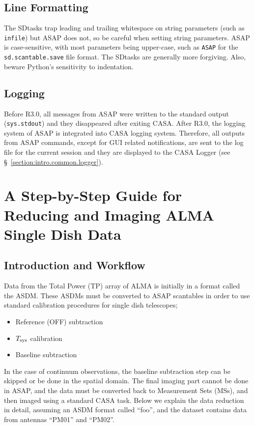 \subsection{Line Formatting}
\label{section:sd.intro.line}

The SDtasks trap leading and trailing whitespace on string parameters
(such as {\tt infile}) but ASAP does not, so be
careful when setting string parameters.  ASAP is case-sensitive,
with most parameters being upper-case, such as {\tt ASAP} for the
{\tt sd.scantable.save} file format.  The SDtasks are generally
more forgiving.  Also, beware Python's sensitivity to indentation.

\subsection{Logging}
\label{section:sd.intro.log}

Before R3.0, all messages from ASAP were written to the standard output
({\tt sys.stdout}) and they disappeared after exiting CASA. After R3.0, the
logging system of ASAP is integrated into CASA logging system.  Therefore, 
all outputs from ASAP commands, except for GUI related notifications, 
are sent to the log file for the current session and they
are displayed to the CASA Logger (see \S~\ref{section:intro.common.logger}). 

%
\section{A Step-by-Step Guide for Reducing and Imaging ALMA Single Dish Data}
\label{section:sd.sdguide}


%
% 
\subsection{Introduction and Workflow}
\label{section:sd.sdguide.intro}

Data from the Total Power (TP) array of ALMA is initially in a format called the 
ASDM.  These ASDMs must be converted to ASAP scantables in order to use standard calibration procedures for
single dish telescopes;

\begin{itemize}
\item
Reference (OFF) subtraction
\item
$T_{\rm sys}$ calibration
\item
Baseline subtraction
\end{itemize}
In the case of continuum observations, the baseline subtraction step can be skipped or be done in the 
spatial domain.  The final imaging part cannot be done in ASAP,  and the data must be converted back to
Measurement Sets (MSs), and then imaged using a standard CASA task.  Below we explain the data reduction in detail, assuming an ASDM
format called ``foo'', and the dataset contains data from antennas ``PM01'' and ``PM02''.  

